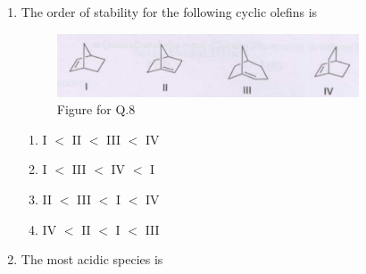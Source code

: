 \documentclass[12pt]{article}
\begin{document}
\begin{enumerate}
\bigskip
    \hfill{}


\item The order of stability for the following cyclic olefins is

\begin{figure}[H]
  \includegraphics[width=0.7\columnwidth]{figs/q8.png} 
  \caption{Figure for Q.8}
    \label{fig:q8}
\end{figure}

\begin{enumerate}
  \item I \(<\) II \(<\) III \(<\) IV
  \item I \(<\) III \(<\) IV \(<\) I
  \item II \(<\) III \(<\) I \(<\) IV
  \item IV \(<\) II \(<\) I \(<\) III
\end{enumerate}    \hfill{}


\item The most acidic species is

   \hfill{}





\end{enumerate}
\end{document}
